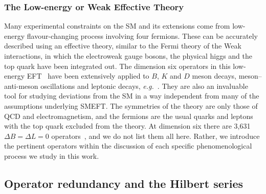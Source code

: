\begin{table}
\begin{center}
    \caption{The table shows the operators featuring in the Warsaw
      basis~\cite{Buchmuller:1985jz, Grzadkowski:2010es} of the dimension-six
      SMEFT that are not four-fermion operators. We point the reader to
      Appendix~\ref{chapter:math-notation} for the correspondence between the
      four-component notation used here and the two-component notation used
      elsewhere in this work for spinors, along with the definition of
      $\bar{D}^{\mu}$. Flavor indices are omitted and should be understood to
      act on fermions in the order $\{r, s\}$ as they appear in each
      operator. \label{tab:smeft-d6-other}}
  \end{center}
\end{table}

\subsubsection{The Low-energy or Weak Effective Theory}

Many experimental constraints on the SM and its extensions come from low-energy
flavour-changing process involving four fermions. These can be accurately
described using an effective theory, similar to the Fermi theory of the Weak
interactions, in which the electroweak gauge bosons, the physical higgs and the
top quark have been integrated out. The dimension six operators in this
low-energy EFT~\cite{Jenkins:2017jig, Aebischer:2017gaw, Jenkins:2017dyc,
  Aebischer:2015fzz} have been extensively applied to $B$, $K$ and $D$ meson
decays, meson--anti-meson oscillations and leptonic decays,
\textit{e.g.}~\cite{Buchalla:1995vs}. They are also an invaluable tool for
studying deviations from the SM in a way independent from many of the
assumptions underlying SMEFT. The symmetries of the theory are only those of QCD
and electromagnetism, and the fermions are the usual quarks and leptons with the
top quark excluded from the theory. At dimension six there are 3,631
$\Delta B = \Delta L = 0$ operators~\cite{Jenkins:2017jig}, and we do not list
them all here. Rather, we introduce the pertinent operators within the
discussion of each specific phenomenological process we study in this work.

\subsection{Operator redundancy and the Hilbert series}

